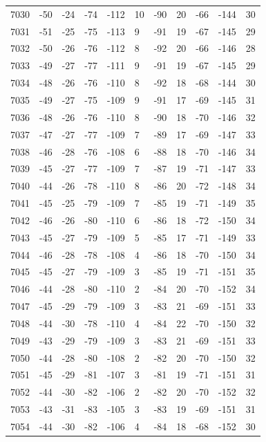 \begin{table}[H]
\begin{tabular}{lllllllllll}
7030 & -50 & -24 & -74 & -112 & 10 & -90 & 20 & -66 & -144 & 30 \\
7031 & -51 & -25 & -75 & -113 & 9 & -91 & 19 & -67 & -145 & 29 \\
7032 & -50 & -26 & -76 & -112 & 8 & -92 & 20 & -66 & -146 & 28 \\
7033 & -49 & -27 & -77 & -111 & 9 & -91 & 19 & -67 & -145 & 29 \\
7034 & -48 & -26 & -76 & -110 & 8 & -92 & 18 & -68 & -144 & 30 \\
7035 & -49 & -27 & -75 & -109 & 9 & -91 & 17 & -69 & -145 & 31 \\
7036 & -48 & -26 & -76 & -110 & 8 & -90 & 18 & -70 & -146 & 32 \\
7037 & -47 & -27 & -77 & -109 & 7 & -89 & 17 & -69 & -147 & 33 \\
7038 & -46 & -28 & -76 & -108 & 6 & -88 & 18 & -70 & -146 & 34 \\
7039 & -45 & -27 & -77 & -109 & 7 & -87 & 19 & -71 & -147 & 33 \\
7040 & -44 & -26 & -78 & -110 & 8 & -86 & 20 & -72 & -148 & 34 \\
7041 & -45 & -25 & -79 & -109 & 7 & -85 & 19 & -71 & -149 & 35 \\
7042 & -46 & -26 & -80 & -110 & 6 & -86 & 18 & -72 & -150 & 34 \\
7043 & -45 & -27 & -79 & -109 & 5 & -85 & 17 & -71 & -149 & 33 \\
7044 & -46 & -28 & -78 & -108 & 4 & -86 & 18 & -70 & -150 & 34 \\
7045 & -45 & -27 & -79 & -109 & 3 & -85 & 19 & -71 & -151 & 35 \\
7046 & -44 & -28 & -80 & -110 & 2 & -84 & 20 & -70 & -152 & 34 \\
7047 & -45 & -29 & -79 & -109 & 3 & -83 & 21 & -69 & -151 & 33 \\
7048 & -44 & -30 & -78 & -110 & 4 & -84 & 22 & -70 & -150 & 32 \\
7049 & -43 & -29 & -79 & -109 & 3 & -83 & 21 & -69 & -151 & 33 \\
7050 & -44 & -28 & -80 & -108 & 2 & -82 & 20 & -70 & -150 & 32 \\
7051 & -45 & -29 & -81 & -107 & 3 & -81 & 19 & -71 & -151 & 31 \\
7052 & -44 & -30 & -82 & -106 & 2 & -82 & 20 & -70 & -152 & 32 \\
7053 & -43 & -31 & -83 & -105 & 3 & -83 & 19 & -69 & -151 & 31 \\
7054 & -44 & -30 & -82 & -106 & 4 & -84 & 18 & -68 & -152 & 30 \\

\end{tabular}
\end{table}
